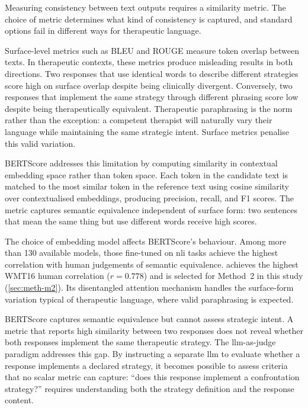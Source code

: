 Measuring consistency between text outputs requires a similarity metric.
The choice of metric determines what kind of consistency is captured, and
standard options fail in different ways for therapeutic language.

Surface-level metrics such as BLEU and ROUGE measure token overlap between
texts. In therapeutic contexts, these metrics produce misleading results in
both directions. Two responses that use identical words to describe different
strategies score high on surface overlap despite being clinically divergent.
Conversely, two responses that implement the same strategy through different
phrasing score low despite being therapeutically equivalent. Therapeutic
paraphrasing is the norm rather than the exception: a competent therapist
will naturally vary their language while maintaining the same strategic
intent. Surface metrics penalise this valid variation.

BERTScore \parencite{PUYCKUYY} addresses this limitation by computing similarity in contextual
embedding space rather than token space. Each token in the candidate text is
matched to the most similar token in the reference text using cosine
similarity over contextualised embeddings, producing precision, recall, and
F1 scores. The metric captures semantic equivalence independent of surface
form: two sentences that mean the same thing but use different words receive
high scores.

The choice of embedding model affects BERTScore's behaviour. Among more than
130 available models, those fine-tuned on \gls{nli} tasks achieve the
highest correlation with human judgements of semantic equivalence.
 \parencite{8MQC2H2V} achieves the highest WMT16 human
correlation ($r = 0.778$) and is selected for Method~2 in this study
(\autoref{sec:meth-m2}). Its disentangled attention mechanism handles the
surface-form variation typical of therapeutic language, where valid
paraphrasing is expected.

BERTScore captures semantic equivalence but cannot assess strategic intent.
A metric that reports high similarity between two responses does not reveal
whether both responses implement the same therapeutic strategy. The
\gls{llm}-as-judge paradigm addresses this gap. By instructing a separate
\gls{llm} to evaluate whether a response implements a declared strategy,
it becomes possible to assess criteria that no scalar metric can capture:
``does this response implement a confrontation strategy?'' requires
understanding both the strategy definition and the response content.

